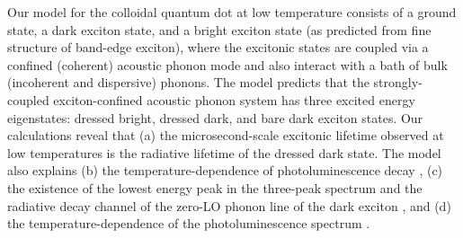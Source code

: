 \documentclass[aps,pra,preprint,groupedaddress]{revtex4-1}
\begin{document}
Our model for the colloidal quantum dot at low temperature consists of a ground state, a dark exciton state, and a bright exciton state (as predicted from fine structure of band-edge exciton), where the excitonic states are coupled via a confined (coherent) acoustic phonon mode and also interact with a bath of bulk (incoherent and dispersive) phonons. The model predicts that the strongly-coupled exciton-confined acoustic phonon system has three excited energy eigenstates: dressed bright, dressed dark, and bare dark exciton states. Our calculations reveal that (a) the microsecond-scale excitonic lifetime observed at low temperatures is the radiative lifetime of the dressed dark state. The model also explains (b) the temperature-dependence of photoluminescence decay \cite{Crooker2003, Biadala2009,Brovelli2011, Raino2011,Labeau2003, DeMelloDonega2006,Oron2009,Werschler2016}, (c) the existence of the lowest energy peak in the three-peak spectrum and the radiative decay channel of the zero-LO phonon line of the dark exciton \cite{Biadala2009}, and (d) the temperature-dependence of the photoluminescence spectrum \cite{Biadala2009}. 
\end{document}
